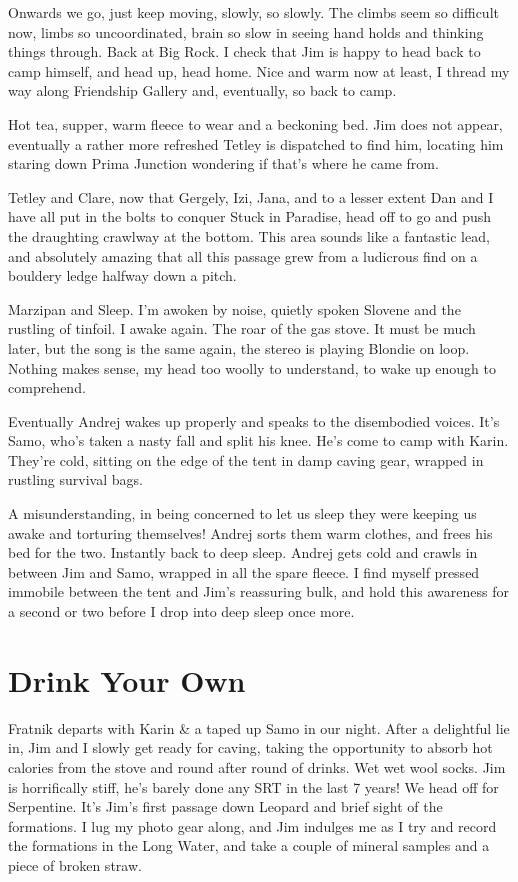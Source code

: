 Onwards we go, just keep moving, slowly, so slowly. The climbs seem so
difficult now, limbs so uncoordinated, brain so slow in seeing hand
holds and thinking things through. Back at Big Rock. I check that Jim is
happy to head back to camp himself, and head up, head home. Nice and
warm now at least, I thread my way along Friendship Gallery and,
eventually, so back to camp.

Hot tea, supper, warm fleece to wear and a beckoning bed. Jim does not
appear, eventually a rather more refreshed Tetley is dispatched to find
him, locating him staring down Prima Junction wondering if that's where
he came from.

Tetley and Clare, now that Gergely, Izi, Jana, and to a lesser extent
Dan and I have all put in the bolts to conquer Stuck in Paradise, head
off to go and push the draughting crawlway at the bottom. This area
sounds like a fantastic lead, and absolutely amazing that all this
passage grew from a ludicrous find on a bouldery ledge halfway down a
pitch.

Marzipan and Sleep. I'm awoken by noise, quietly spoken Slovene and the
rustling of tinfoil. I awake again. The roar of the gas stove. It must
be much later, but the song is the same again, the stereo is playing
Blondie on loop. Nothing makes sense, my head too woolly to understand,
to wake up enough to comprehend.

Eventually Andrej wakes up properly and speaks to the disembodied
voices. It's Samo, who's taken a nasty fall and split his knee. He's
come to camp with Karin. They're cold, sitting on the edge of the tent
in damp caving gear, wrapped in rustling survival bags.

A misunderstanding, in being concerned to let us sleep they were keeping
us awake and torturing themselves! Andrej sorts them warm clothes, and
frees his bed for the two. Instantly back to deep sleep. Andrej gets
cold and crawls in between Jim and Samo, wrapped in all the spare
fleece. I find myself pressed immobile between the tent and Jim's
reassuring bulk, and hold this awareness for a second or two before I
drop into deep sleep once more.


\section{Drink Your Own}

Fratnik departs with Karin \& a taped up Samo in our night. After a
delightful lie in, Jim and I slowly get ready for caving, taking the
opportunity to absorb hot calories from the stove and round after round
of drinks. Wet wet wool socks. Jim is horrifically stiff, he's barely
done any SRT in the last 7 years! We head off for Serpentine. It's Jim's
first passage down Leopard and brief sight of the formations. I lug my
photo gear along, and Jim indulges me as I try and record the formations
in the Long Water, and take a couple of mineral samples and a piece of
broken straw.

